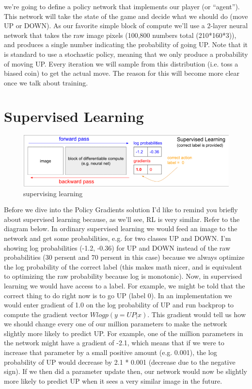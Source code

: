 \documentclass[12pt,a4paper]{article}
\begin{document}
we're going to define a policy network that implements our player (or “agent”). This network will take the state of the game and decide what we should do (move UP or DOWN). As our favorite simple block of compute we'll use a 2-layer neural network that takes the raw image pixels (100,800 numbers total (210*160*3)), and produces a single number indicating the probability of going UP. Note that it is standard to use a stochastic policy, meaning that we only produce a probability of moving UP. Every iteration we will sample from this distribution (i.e. toss a biased coin) to get the actual move. The reason for this will become more clear once we talk about training.\\


\section{Supervised Learning}
\begin{figure}[hbt!]
\begin{center}
\includegraphics[scale=0.74]{supervising learning}
\caption{supervising learning }%
\end{center}
\end{figure}
\textbf{}
Before we dive into the Policy Gradients solution I'd like to remind you briefly about supervised learning because, as we'll see, RL is very similar. Refer to the diagram below. In ordinary supervised learning we would feed an image to the network and get some probabilities, e.g. for two classes UP and DOWN. I'm showing log probabilities (-1.2, -0.36) for UP and DOWN instead of the raw probabilities (30 persent and 70 persent in this case) because we always optimize the log probability of the correct label (this makes math nicer, and is equivalent to optimizing the raw probability because log is monotonic). Now, in supervised learning we would have access to a label. For example, we might be told that the correct thing to do right now is to go UP (label 0). In an implementation we would enter gradient of 1.0 on the log probability of UP and run backprop to compute the gradient vector $Wlogp(y=UP|x)$. This gradient would tell us how we should change every one of our million parameters to make the network slightly more likely to predict UP. For example, one of the million parameters in the network might have a gradient of -2.1, which means that if we were to increase that parameter by a small positive amount (e.g. 0.001), the log probability of UP would decrease by 2.1 * 0.001 (decrease due to the negative sign). If we then did a parameter update then, our network would now be slightly more likely to predict UP when it sees a very similar image in the future.\\
\end{document}
